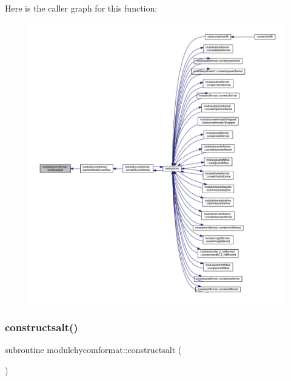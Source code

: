 Here is the caller graph for this function\+:\nopagebreak
\begin{figure}[H]
\begin{center}
\leavevmode
\includegraphics[width=350pt]{namespacemodulehycomformat_a9517a6d8966a57eda71abf77acd790cb_icgraph}
\end{center}
\end{figure}
\mbox{\label{namespacemodulehycomformat_a4e0166792e4a82d98b34a54327ca161b}} 
\subsubsection{\texorpdfstring{constructsalt()}{constructsalt()}}
{\footnotesize\ttfamily subroutine modulehycomformat\+::constructsalt (\begin{DoxyParamCaption}{ }\end{DoxyParamCaption})\hspace{0.3cm}{\ttfamily [private]}}

